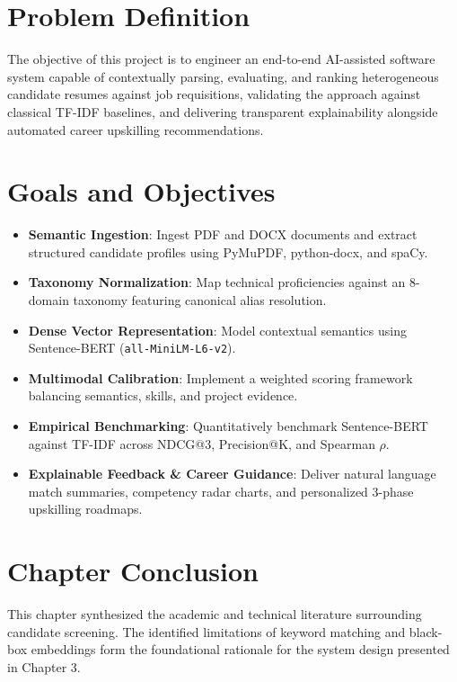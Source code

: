 \documentclass[12pt,a4paper]{report}
\begin{document}
\section{Problem Definition}
The objective of this project is to engineer an end-to-end AI-assisted software system capable of contextually parsing, evaluating, and ranking heterogeneous candidate resumes against job requisitions, validating the approach against classical TF-IDF baselines, and delivering transparent explainability alongside automated career upskilling recommendations.

\section{Goals and Objectives}
\begin{itemize}
    \item \textbf{Semantic Ingestion}: Ingest PDF and DOCX documents and extract structured candidate profiles using PyMuPDF, python-docx, and spaCy.
    \item \textbf{Taxonomy Normalization}: Map technical proficiencies against an 8-domain taxonomy featuring canonical alias resolution.
    \item \textbf{Dense Vector Representation}: Model contextual semantics using Sentence-BERT (\texttt{all-MiniLM-L6-v2}).
    \item \textbf{Multimodal Calibration}: Implement a weighted scoring framework balancing semantics, skills, and project evidence.
    \item \textbf{Empirical Benchmarking}: Quantitatively benchmark Sentence-BERT against TF-IDF across NDCG@3, Precision@K, and Spearman $\rho$.
    \item \textbf{Explainable Feedback \& Career Guidance}: Deliver natural language match summaries, competency radar charts, and personalized 3-phase upskilling roadmaps.
\end{itemize}

\section{Chapter Conclusion}
This chapter synthesized the academic and technical literature surrounding candidate screening. The identified limitations of keyword matching and black-box embeddings form the foundational rationale for the system design presented in Chapter 3.

\end{document}
